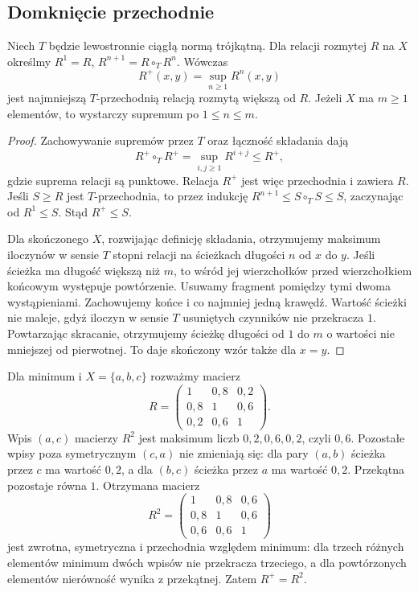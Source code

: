 \subsection{Domknięcie przechodnie}

\begin{twierdzenie}\label{thm:lst-fuzzy-transitive-closure}
Niech $T$ będzie lewostronnie ciągłą normą trójkątną.
Dla relacji rozmytej $R$ na $X$ określmy $R^1=R$,
$R^{n+1}=R\circ_T R^n$. Wówczas
\[
 R^+(x,y)=\sup_{n\geq1}R^n(x,y)
\]
jest najmniejszą $T$-przechodnią relacją rozmytą większą od $R$.
Jeżeli $X$ ma $m\geq1$ elementów, to wystarczy supremum
po $1\leq n\leq m$.
\end{twierdzenie}
\begin{proof}
Zachowywanie supremów przez $T$ oraz łączność składania
dają
\[
 R^+\circ_T R^+=\sup_{i,j\geq1}R^{i+j}\leq R^+,
\]
gdzie suprema relacji są punktowe. Relacja $R^+$ jest
więc przechodnia i zawiera $R$. Jeśli $S\geq R$ jest
$T$-przechodnia, to przez indukcję
$R^{n+1}\leq S\circ_T S\leq S$, zaczynając od $R^1\leq S$.
Stąd $R^+\leq S$.

Dla skończonego $X$, rozwijając definicję składania,
otrzymujemy maksimum iloczynów w sensie $T$ stopni relacji
na ścieżkach długości $n$ od $x$ do $y$.
Jeśli ścieżka ma długość większą niż $m$, to wśród
jej wierzchołków przed wierzchołkiem końcowym występuje
powtórzenie. Usuwamy fragment pomiędzy tymi dwoma
wystąpieniami. Zachowujemy końce i co najmniej jedną
krawędź. Wartość ścieżki nie maleje, gdyż iloczyn w sensie
$T$ usuniętych czynników nie przekracza $1$.
Powtarzając skracanie, otrzymujemy ścieżkę długości
od $1$ do $m$ o wartości nie mniejszej od pierwotnej.
To daje skończony wzór także dla $x=y$.
\end{proof}

\begin{przyklad}
\label{ex:lst-fuzzy-relation-matrix}
Dla minimum i $X=\{a,b,c\}$ rozważmy macierz
\[
 R=\begin{pmatrix}
 1&0{,}8&0{,}2\\
 0{,}8&1&0{,}6\\
 0{,}2&0{,}6&1
 \end{pmatrix}.
\]
Wpis $(a,c)$ macierzy $R^2$ jest maksimum liczb
$0{,}2,0{,}6,0{,}2$, czyli $0{,}6$.
Pozostałe wpisy poza symetrycznym $(c,a)$ nie zmieniają się:
dla pary $(a,b)$ ścieżka przez $c$ ma wartość $0{,}2$,
a dla $(b,c)$ ścieżka przez $a$ ma wartość $0{,}2$.
Przekątna pozostaje równa $1$. Otrzymana macierz
\[
 R^2=\begin{pmatrix}
 1&0{,}8&0{,}6\\
 0{,}8&1&0{,}6\\
 0{,}6&0{,}6&1
 \end{pmatrix}
\]
jest zwrotna, symetryczna i przechodnia względem minimum:
dla trzech różnych elementów minimum dwóch wpisów
nie przekracza trzeciego, a dla powtórzonych elementów
nierówność wynika z przekątnej. Zatem $R^+=R^2$.
\end{przyklad}

